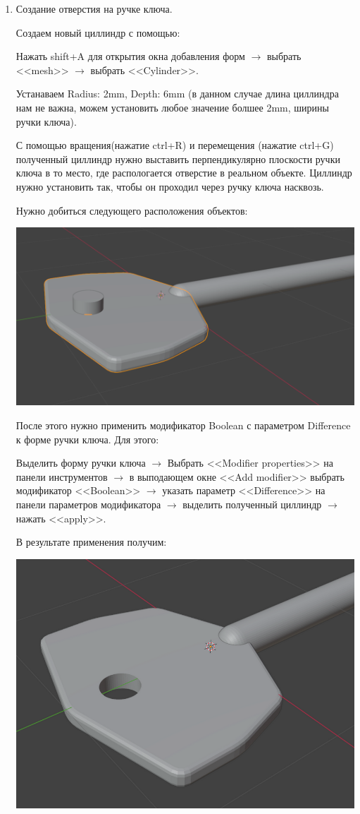 \documentclass[12pt]{article}
\begin{document}
\begin{enumerate}
\item Создание отверстия на ручке ключа.

Создаем новый циллиндр с помощью:

Нажать shift+A  для открытия окна добавления форм $\to $ выбрать <<mesh>> $\to $ выбрать <<Cylinder>>.

Устанаваем Radius: 2mm, Depth: 6mm (в данном случае длина циллиндра нам не важна, можем установить любое значение болшее 2mm, ширины ручки ключа).

 С помощью вращения(нажатие ctrl+R) и перемещения (нажатие ctrl+G)   полученный циллиндр нужно выставить перпендикулярно плоскости ручки ключа в то место, где распологается отверстие в реальном объекте. Циллиндр нужно установить так, чтобы он проходил через ручку ключа насквозь.
 
Нужно добиться следующего расположения объектов:

\vskip 1cm
{
    \centering
    \includegraphics[width=0.8\linewidth]{3cyl4.png}
    \label{fig:i1}
}
\vskip 1cm
 

После этого нужно применить модификатор Boolean с параметром Difference к форме ручки ключа. Для этого:


Выделить форму ручки ключа $\to $ Выбрать <<Modifier properties>> на панели инструментов $\to $ в выподающем окне <<Add modifier>>  выбрать модификатор <<Boolean>> $\to $ указать параметр <<Difference>> на панели параметров модификатора $\to $ выделить полученный циллиндр $\to $ нажать <<apply>>.

В результате применения получим:

\vskip 1cm
{
    \centering
    \includegraphics[width=0.8\linewidth]{3дыра.png}
    \label{fig:i1}
}
\vskip 1cm






\end{enumerate}
\end{document}
